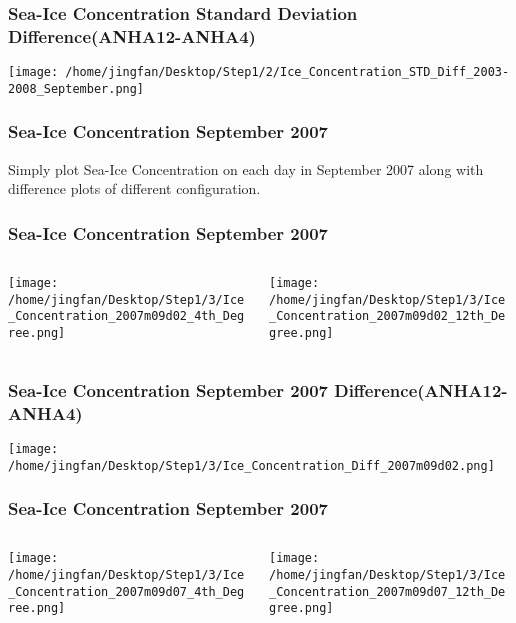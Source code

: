 \documentclass{beamer}
\begin{document}
\begin{frame}
\frametitle{Sea-Ice Concentration Standard Deviation Difference(ANHA12-ANHA4)}

\texttt{[image: /home/jingfan/Desktop/Step1/2/Ice\_Concentration\_STD\_Diff\_2003-2008\_September.png]}

\end{frame}

\begin{frame}
\frametitle{Sea-Ice Concentration September 2007}
Simply plot Sea-Ice Concentration on each day in September 2007 along with difference plots of different configuration.
\end{frame}

\begin{frame}
\frametitle{Sea-Ice Concentration September 2007}

\begin{columns}
\begin{column}[t]{0.5\linewidth}
\centering
\texttt{[image: /home/jingfan/Desktop/Step1/3/Ice\_Concentration\_2007m09d02\_4th\_Degree.png]}
\end{column}
\begin{column}[t]{0.5\linewidth}
\centering
\texttt{[image: /home/jingfan/Desktop/Step1/3/Ice\_Concentration\_2007m09d02\_12th\_Degree.png]}
\end{column}
\end{columns}

\end{frame}

\begin{frame}
\frametitle{Sea-Ice Concentration September 2007 Difference(ANHA12-ANHA4)}

\texttt{[image: /home/jingfan/Desktop/Step1/3/Ice\_Concentration\_Diff\_2007m09d02.png]}

\end{frame}

\begin{frame}
\frametitle{Sea-Ice Concentration September 2007}

\begin{columns}
\begin{column}[t]{0.5\linewidth}
\centering
\texttt{[image: /home/jingfan/Desktop/Step1/3/Ice\_Concentration\_2007m09d07\_4th\_Degree.png]}
\end{column}
\begin{column}[t]{0.5\linewidth}
\centering
\texttt{[image: /home/jingfan/Desktop/Step1/3/Ice\_Concentration\_2007m09d07\_12th\_Degree.png]}
\end{column}
\end{columns}

\end{frame}
\end{document}
